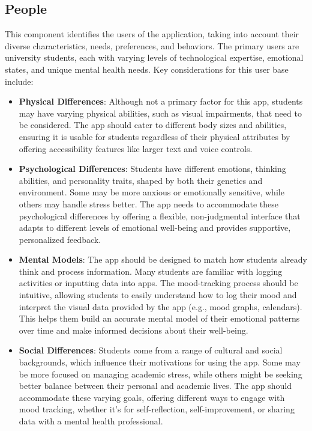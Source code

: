 \subsection{People}

This component identifies the users of the application, taking into account their diverse characteristics, needs, preferences, and behaviors. The primary users are university students, each with varying levels of technological expertise, emotional states, and unique mental health needs. Key considerations for this user base include:

\begin{itemize}
    \item \textbf{Physical Differences}: Although not a primary factor for this app, students may have varying physical abilities, such as visual impairments, that need to be considered. The app should cater to different body sizes and abilities, ensuring it is usable for students regardless of their physical attributes by offering accessibility features like larger text and voice controls.
    \item \textbf{Psychological Differences}: Students have different emotions, thinking abilities, and personality traits, shaped by both their genetics and environment. Some may be more anxious or emotionally sensitive, while others may handle stress better. The app needs to accommodate these psychological differences by offering a flexible, non-judgmental interface that adapts to different levels of emotional well-being and provides supportive, personalized feedback.
    \item \textbf{Mental Models}: The app should be designed to match how students already think and process information. Many students are familiar with logging activities or inputting data into apps. The mood-tracking process should be intuitive, allowing students to easily understand how to log their mood and interpret the visual data provided by the app (e.g., mood graphs, calendars). This helps them build an accurate mental model of their emotional patterns over time and make informed decisions about their well-being.
    \item \textbf{Social Differences}: Students come from a range of cultural and social backgrounds, which influence their motivations for using the app. Some may be more focused on managing academic stress, while others might be seeking better balance between their personal and academic lives. The app should accommodate these varying goals, offering different ways to engage with mood tracking, whether it’s for self-reflection, self-improvement, or sharing data with a mental health professional.
\end{itemize}

